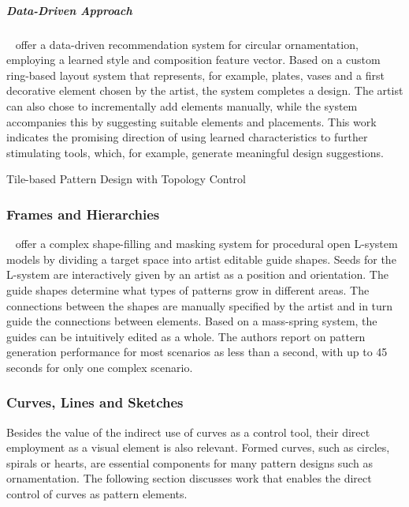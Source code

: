 


\subparagraph{Data-Driven Approach}
\label{subpara:analysis_element_arrangements_datadriven}

\citeauthor*{phan_2016_ple}~\cite{phan_2016_ple} offer a data-driven recommendation system for circular ornamentation, employing a learned style and composition feature vector. Based on a custom ring-based layout system that represents, for example, plates, vases and a first decorative element chosen by the artist, the system completes a design. The artist can also chose to incrementally add elements manually, while the system accompanies this by suggesting suitable elements and placements. This work indicates the promising direction of using learned characteristics to further stimulating tools, which, for example, generate meaningful design suggestions.



Tile-based Pattern Design with Topology Control

\subsubsection{Frames and Hierarchies}
\label{subsubsec:analysis_frames_and_hierarchies}

\citeauthor*{benes_2011_gpm}~\cite{benes_2011_gpm} offer a complex shape-filling and masking system for procedural open L-system models by dividing a target space into artist editable guide shapes. Seeds for the L-system are interactively given by an artist as a position and orientation. The guide shapes determine what types of patterns grow in different areas. The connections between the shapes are manually specified by the artist and in turn guide the connections between elements. Based on a mass-spring system, the guides can be intuitively edited as a whole. The authors report on pattern generation performance for most scenarios as less than a second, with up to 45 seconds for only one complex scenario.



\subsubsection{Curves, Lines and Sketches}
\label{subsubsec:analysis_curves_lines_and_sketches}

Besides the value of the indirect use of curves as a control tool, their direct employment as a visual element is also relevant. Formed curves, such as circles, spirals or hearts, are essential components for many pattern designs such as ornamentation. The following section discusses work that enables the direct control of curves as pattern elements.

